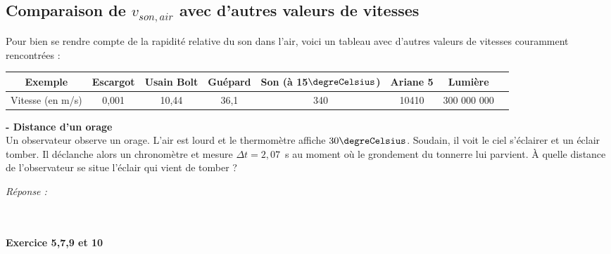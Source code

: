 \subsection{Comparaison de $v_{son, air}$ avec d'autres valeurs de vitesses}
Pour bien se rendre compte de la rapidité relative du son dans l'air, voici un tableau avec d'autres valeurs de vitesses couramment rencontrées :
\begin{center}
    \begin{tabular}{|c|c|c|c|c|c|c|c|}
\hline
     \cellcolor{blue!25}Exemple & Escargot & Usain Bolt & Guépard & Son (à 15$\degreCelsius$)  & Ariane 5 & Lumière \\
     \hline 
     \cellcolor{blue!25}Vitesse (en m/s) & 0,001 & 10,44 & 36,1 & 340 & 10410 & 300 000 000\\
     \hline
\end{tabular}
\end{center}

\begin{mdframed}[style=autreexo]
\textbf{ - Distance d'un orage}\\
Un observateur observe un orage. L'air est lourd et le thermomètre affiche $30\degreCelsius$. Soudain, il voit le ciel s'éclairer et un éclair tomber. Il déclanche alors un chronomètre et mesure $\Delta t = 2,07$~s au moment où le grondement du tonnerre lui parvient. \`{A} quelle distance de l'observateur se situe l'éclair qui vient de tomber ?
\end{mdframed}
\textit{Réponse : } \\
\\
\\
\begin{Large}
\end{Large}\textbf{Exercice 5,7,9 et 10}

